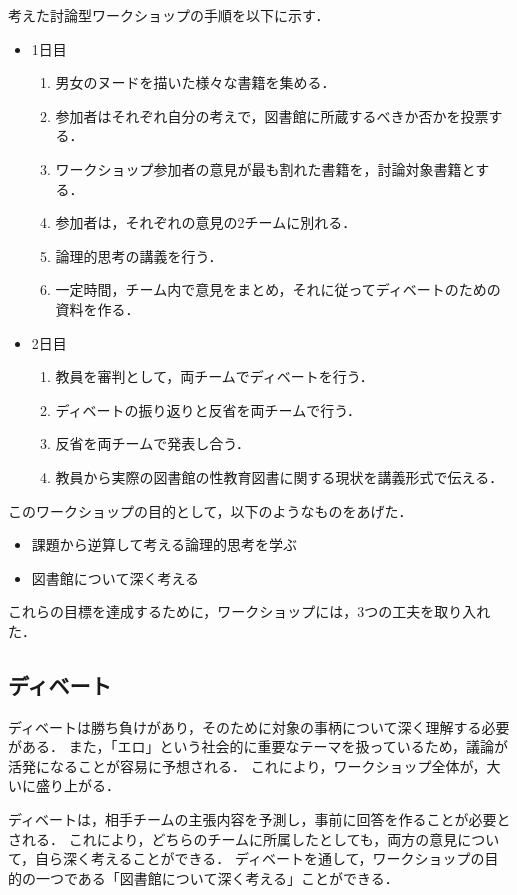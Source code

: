 \documentclass[uplatex,a4paper]{jsarticle}
\begin{document}
考えた討論型ワークショップの手順を以下に示す．
\begin{itemize}
    \item 1日目
    \begin{enumerate}
        \item 男女のヌードを描いた様々な書籍を集める．
        \item 参加者はそれぞれ自分の考えで，図書館に所蔵するべきか否かを投票する．
        \item ワークショップ参加者の意見が最も割れた書籍を，討論対象書籍とする．
        \item 参加者は，それぞれの意見の2チームに別れる．
        \item 論理的思考の講義を行う．
        \item 一定時間，チーム内で意見をまとめ，それに従ってディベートのための資料を作る．
    \end{enumerate}
    \item 2日目
    \begin{enumerate}
        \item 教員を審判として，両チームでディベートを行う．
        \item ディベートの振り返りと反省を両チームで行う．
        \item 反省を両チームで発表し合う．
        \item 教員から実際の図書館の性教育図書に関する現状を講義形式で伝える．
    \end{enumerate}
\end{itemize}

このワークショップの目的として，以下のようなものをあげた．
\begin{itemize}
    \item 課題から逆算して考える論理的思考を学ぶ
    \item 図書館について深く考える
\end{itemize}

これらの目標を達成するために，ワークショップには，3つの工夫を取り入れた．

\subsection{ディベート}
ディベートは勝ち負けがあり，そのために対象の事柄について深く理解する必要がある．
また，「エロ」という社会的に重要なテーマを扱っているため，議論が活発になることが容易に予想される．
これにより，ワークショップ全体が，大いに盛り上がる．

ディベートは，相手チームの主張内容を予測し，事前に回答を作ることが必要とされる．
これにより，どちらのチームに所属したとしても，両方の意見について，自ら深く考えることができる．
ディベートを通して，ワークショップの目的の一つである「図書館について深く考える」ことができる．
\end{document}

